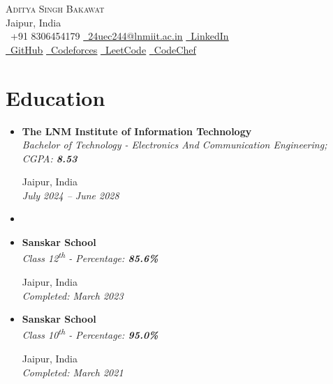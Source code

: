 \documentclass[a4paper,11pt]{article}
\newcommand{\resumeSubheading}[4]{%
  \item
  \begin{minipage}[t]{0.66\linewidth}%
    \textbf{#1}\\[2pt]%
    \textit{#3}%
  \end{minipage}%
  \hfill %
  \begin{minipage}[t]{0.32\linewidth}%
    \raggedleft #2 \\[2pt] \textit{#4}%
  \end{minipage}%
  \vspace{-6pt}%
}
\newcommand{\resumeSubHeadingListStart}{\begin{itemize}[leftmargin=*]}
\newcommand{\resumeSubHeadingListEnd}{\end{itemize}\vspace{1pt}}
\begin{document}
\begin{center}
	  \vspace{-45pt}
	  {\Huge \scshape Aditya Singh Bakawat} \\[2pt]
	  Jaipur, India \\[3pt]
	  \small
	  \raisebox{-0.1\height}\faPhone\ +91 8306454179 \quad
	  \href{mailto:24uec244@lnmiit.ac.in}{\raisebox{-0.2\height}\faEnvelope\ \underline{24uec244@lnmiit.ac.in}} \quad
	  \href{https://www.linkedin.com/in/aditya-singh-bakawat-5015a9323//}{\raisebox{-0.2\height}\faLinkedin\ \underline{LinkedIn}} \\
	  \href{https://github.com/CyberKun}{\raisebox{-0.2\height}\faGithub\ \underline{GitHub}} \quad
	  \href{https://codeforces.com/profile/Bruten}{\raisebox{-0.2\height}\faLink\ \underline{Codeforces}} \quad
	  \href{https://leetcode.com/u/Onee_Chan/}{\raisebox{-0.2\height}\faLink\ \underline{LeetCode}} \quad
	  \href{https://www.codechef.com/users/main_noble_29}{\raisebox{-0.2\height}\faLink\ \underline{CodeChef}}
\end{center}
\vspace{-18pt}

\section{Education}
  \resumeSubHeadingListStart
    \resumeSubheading
      {The LNM Institute of Information Technology}{Jaipur, India}
      {Bachelor of Technology - Electronics And Communication Engineering; CGPA: \textbf{8.53}}{July 2024 -- June 2028}
    
    \item[] \vspace{2pt} %
     \vspace{-4pt}
    \resumeSubheading
      {Sanskar School}{Jaipur, India}
      {Class 12\textsuperscript{th} - Percentage: \textbf{85.6\%}}{Completed: March 2023}

    \resumeSubheading
      {Sanskar School}{Jaipur, India}
      {Class 10\textsuperscript{th} - Percentage: \textbf{95.0\%}}{Completed: March 2021}
  \resumeSubHeadingListEnd
\end{document}
